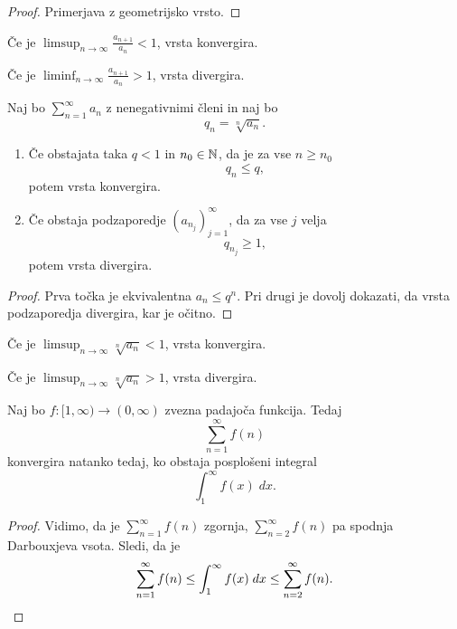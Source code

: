 \documentclass[12pt, a4paper]{article}
\begin{document}
\begin{proof}
Primerjava z geometrijsko vrsto.
\end{proof}

\begin{posledica}
Če je $\displaystyle\limsup_{n\to\infty}\frac{a_{n+1}}{a_n}<1$, vrsta konvergira.
\end{posledica}

\begin{posledica}
Če je $\displaystyle\liminf_{n\to\infty}\frac{a_{n+1}}{a_n}>1$, vrsta divergira.
\end{posledica}

\begin{izrek}
Naj bo $\displaystyle\sum_{n=1}^\infty a_n$ z nenegativnimi členi in naj bo
\[
q_n=\sqrt[n]{a_n}.
\]

\begin{enumerate}[label=\roman*)]
\item Če obstajata taka $q<1$ in $n_0\in\mathbb{N}$, da je za vse $n\geq n_0$
\[
q_n\leq q,
\]
potem vrsta konvergira.
\item Če obstaja podzaporedje $(a_{n_j})_{j=1}^\infty$, da za vse $j$ velja
\[
q_{n_j}\geq 1,
\]
potem vrsta divergira.
\end{enumerate}
\end{izrek}

\begin{proof}
Prva točka je ekvivalentna $a_n\leq q^n$. Pri drugi je dovolj dokazati, da vrsta podzaporedja divergira, kar je očitno.
\end{proof}

\begin{posledica}
Če je $\displaystyle\limsup_{n\to\infty}\sqrt[n]{a_n}<1$, vrsta konvergira.
\end{posledica}

\begin{posledica}
Če je $\displaystyle\limsup_{n\to\infty}\sqrt[n]{a_n}>1$, vrsta divergira.
\end{posledica}

\begin{izrek}
Naj bo $f\colon[1,\infty)\to(0,\infty)$ zvezna padajoča funkcija. Tedaj
\[
\sum_{n=1}^\infty f(n)
\]
konvergira natanko tedaj, ko obstaja posplošeni integral
\[
\int_1^\infty f(x)\;dx.
\]
\end{izrek}

\begin{proof}
Vidimo, da je $\displaystyle\sum_{n=1}^\infty f(n)$ zgornja, $\displaystyle\sum_{n=2}^\infty f(n)$ pa spodnja Darbouxjeva vsota. Sledi, da je
\[
\sum_{n=1}^\infty f(n)\leq \int_1^\infty f(x)\;dx\leq \sum_{n=2}^\infty f(n).\qedhere
\]
\end{proof}
\end{document}
